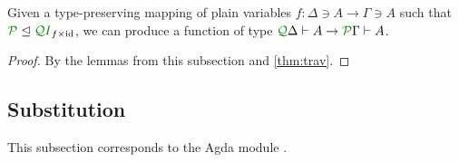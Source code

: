 \documentclass[submission,copyright,creativecommons]{eptcs}
\begin{document}
\begin{corollary}\label{cor:ren}
  Given a type-preserving mapping of plain variables
  $f : \Delta \ni A \to \Gamma \ni A$ such that
  $\resctx P \subres \resctx Q\rescomment I_{f\times\id}$,
  we can produce a function of type
  $\ctx{\Delta}{Q} \vdash A \to \ctx{\Gamma}{P} \vdash A$.
\end{corollary}
\begin{proof}
  By the lemmas from this subsection and \autoref{thm:trav}.
\end{proof}

\subsection{Substitution}

This subsection corresponds to the Agda module
.
\end{document}
